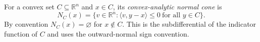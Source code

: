 
For a convex set $C\subseteq\mathbb R^n$ and $x\in C$, its \emph{convex-analytic normal cone} is
\[
N_C(x)=\{v\in\mathbb R^n:\langle v,y-x\rangle\le0\ \text{for all }y\in C\}.
\]
By convention $N_C(x)=\varnothing$ for $x\notin C$. This is the subdifferential of the indicator function of $C$ and uses the outward-normal sign convention.
